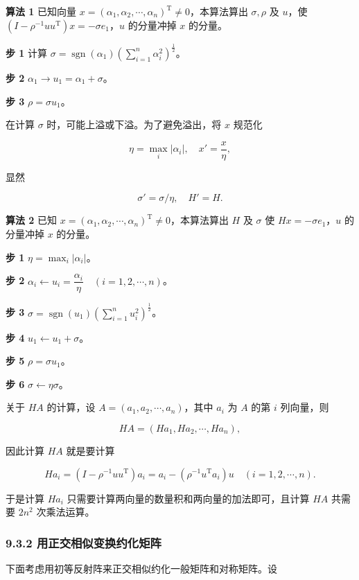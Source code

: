 \documentclass[
  10pt,
  fontset=fandol]{ctexart}
\begin{document}
\textbf{算法 1} 已知向量 \(x=(\alpha_1,\alpha_2,\cdots,\alpha_n)^{\mathrm T}\ne0\)，本算法算出 \(\sigma,\rho\) 及 \(u\)，使 \((I-\rho^{-1}uu^{\mathrm T})x=-\sigma e_1\)，\(u\) 的分量冲掉 \(x\) 的分量。

\textbf{步 1} 计算 \(\sigma=\operatorname{sgn}(\alpha_1)\left(\displaystyle\sum_{i=1}^n\alpha_i^2\right)^{\frac12}\)。

\textbf{步 2} \(\alpha_1\to u_1=\alpha_1+\sigma\)。

\textbf{步 3} \(\rho=\sigma u_1\)。

在计算 \(\sigma\) 时，可能上溢或下溢。为了避免溢出，将 \(x\) 规范化

\[
\eta=\max_i|\alpha_i|,\quad x'=\frac{x}{\eta},
\]

显然

\[
\sigma'=\sigma/\eta,\quad H'=H.
\]

\textbf{算法 2} 已知 \(x=(\alpha_1,\alpha_2,\cdots,\alpha_n)^{\mathrm T}\ne0\)，本算法算出 \(H\) 及 \(\sigma\) 使 \(Hx=-\sigma e_1\)，\(u\) 的分量冲掉 \(x\) 的分量。

\textbf{步 1} \(\eta=\max_i|\alpha_i|\)。

\textbf{步 2} \(\alpha_i\leftarrow u_i=\dfrac{\alpha_i}{\eta}\quad(i=1,2,\cdots,n)\)。

\textbf{步 3} \(\sigma=\operatorname{sgn}(u_1)\left(\displaystyle\sum_{i=1}^nu_i^2\right)^{\frac12}\)。

\textbf{步 4} \(u_1\leftarrow u_1+\sigma\)。

\textbf{步 5} \(\rho=\sigma u_1\)。

\textbf{步 6} \(\sigma\leftarrow\eta\sigma\)。

关于 \(HA\) 的计算，设 \(A=(a_1,a_2,\cdots,a_n)\)，其中 \(a_i\) 为 \(A\) 的第 \(i\) 列向量，则

\[
HA=(Ha_1,Ha_2,\cdots,Ha_n),
\]

因此计算 \(HA\) 就是要计算

\[
Ha_i=(I-\rho^{-1}uu^{\mathrm T})a_i=a_i-(\rho^{-1}u^{\mathrm T}a_i)u\quad(i=1,2,\cdots,n).
\]

于是计算 \(Ha_i\) 只需要计算两向量的数量积和两向量的加法即可，且计算 \(HA\) 共需要 \(2n^2\) 次乘法运算。

\subsubsection{9.3.2 用正交相似变换约化矩阵}\label{ux7528ux6b63ux4ea4ux76f8ux4f3cux53d8ux6362ux7ea6ux5316ux77e9ux9635}

下面考虑用初等反射阵来正交相似约化一般矩阵和对称矩阵。设
\end{document}
